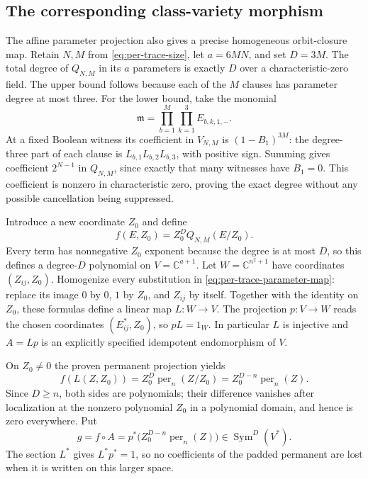 \subsection{The corresponding class-variety morphism}

The affine parameter projection also gives a precise homogeneous
orbit-closure map. Retain $N,M$ from \eqref{eq:per-trace-size}, let
$a=6MN$, and set $D=3M$. The total degree of $Q_{N,M}$ in its
$a$ parameters is exactly $D$ over a characteristic-zero field.
The upper bound follows because each of the $M$ clauses has parameter
degree at most three. For the lower bound, take the monomial
\[
 \mathfrak m=\prod_{b=1}^{M}\prod_{k=1}^3 E_{b,k,1,-}.
\]
At a fixed Boolean witness its coefficient in $V_{N,M}$ is
$(1-B_1)^{3M}$: the degree-three part of each clause is
$L_{b,1}L_{b,2}L_{b,3}$, with positive sign. Summing gives coefficient
$2^{N-1}$ in $Q_{N,M}$, since exactly that many witnesses have $B_1=0$.
This coefficient is nonzero in characteristic zero, proving the exact
degree without any possible cancellation being suppressed.

Introduce a new coordinate $Z_0$ and define
\[
 f(E,Z_0)=Z_0^D Q_{N,M}(E/Z_0).
\]
Every term has nonnegative $Z_0$ exponent because the degree is at
most $D$, so this defines a degree-$D$ polynomial on
$V=\mathbb C^{a+1}$. Let $W=\mathbb C^{n^2+1}$ have coordinates
$(Z_{ij},Z_0)$. Homogenize every substitution in
\eqref{eq:per-trace-parameter-map}: replace its image $0$ by $0$,
$1$ by $Z_0$, and $Z_{ij}$ by itself. Together with the identity on
$Z_0$, these formulas define a linear map $L:W\to V$.
The projection $p:V\to W$ reads the chosen coordinates
$(E^*_{ij},Z_0)$, so $pL=1_W$. In particular $L$ is injective and
$A=Lp$ is an explicitly specified idempotent endomorphism of $V$.

On $Z_0\ne0$ the proven permanent projection yields
\[
 f(L(Z,Z_0))
 =Z_0^D\operatorname{per}_n(Z/Z_0)
 =Z_0^{D-n}\operatorname{per}_n(Z).
\]
Since $D\ge n$, both sides are polynomials; their difference vanishes
after localization at the nonzero polynomial $Z_0$ in a polynomial
domain, and hence is zero everywhere. Put
\[
 g=f\circ A=p^*\bigl(Z_0^{D-n}\operatorname{per}_n(Z)\bigr)
   \in\operatorname{Sym}^D(V^*).
\]
The section $L^*$ gives $L^*p^*=1$, so no coefficients of the
padded permanent are lost when it is written on this larger space.

